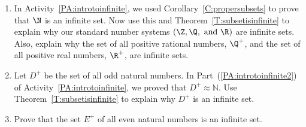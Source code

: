 \hbreak
%
%
\begin{prog} \label{E:infinitesets} \hfill
\begin{enumerate}
\item In \typeu Activity~\ref*{PA:introtoinfinite}, we used Corollary~\ref{C:propersubsets} to prove that $\N$ is an infinite set.  Now use this and Theorem~\ref{T:subsetisinfinite} to explain why our standard number systems $( \Z, \Q, \text{ and } \R )$ are infinite sets.  Also, explain why the set of all positive rational numbers, 
$\Q^+$, and the set of all positive real numbers, $\R^+$, are infinite sets.

\item Let $D^+$ be the set of all odd natural numbers.  In Part~(\ref{PA:introtoinfinite2}) of \typeu Activity~\ref*{PA:introtoinfinite}, we proved that $D^+ \approx \mathbb{N}$.  Use 
Theorem~\ref{T:subsetisinfinite} to explain why $D^+$ is an infinite set.  

\item Prove that the set $E^+$ of all even natural numbers is an infinite set.
\end{enumerate}
\end{prog}
\hbreak

\endinput

